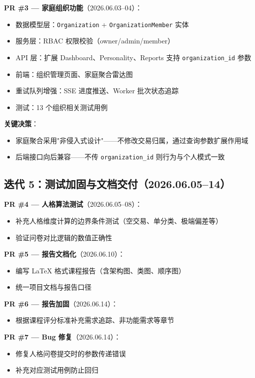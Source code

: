 \textbf{PR \#3 — 家庭组织功能}（2026.06.03--04）：
\begin{itemize}
  \item 数据模型层：\texttt{Organization} + \texttt{OrganizationMember} 实体
  \item 服务层：RBAC 权限校验（owner/admin/member）
  \item API 层：扩展 Dashboard、Personality、Reports 支持 \texttt{organization\_id} 参数
  \item 前端：组织管理页面、家庭聚合雷达图
  \item 重试队列增强：SSE 进度推送、Worker 批次状态追踪
  \item 测试：13 个组织相关测试用例
\end{itemize}

\textbf{关键决策}：
\begin{itemize}
  \item 家庭聚合采用"非侵入式设计"——不修改交易归属，通过查询参数扩展作用域
  \item 后端接口向后兼容——不传 \texttt{organization\_id} 则行为与个人模式一致
\end{itemize}

\subsection{迭代 5：测试加固与文档交付（2026.06.05--14）}

\textbf{PR \#4 — 人格算法测试}（2026.06.05--08）：
\begin{itemize}
  \item 补充人格维度计算的边界条件测试（空交易、单分类、极端偏差等）
  \item 验证问卷对比逻辑的数值正确性
\end{itemize}

\textbf{PR \#5 — 报告文档化}（2026.06.10）：
\begin{itemize}
  \item 编写 LaTeX 格式课程报告（含架构图、类图、顺序图）
  \item 统一项目文档与报告口径
\end{itemize}

\textbf{PR \#6 — 报告加固}（2026.06.14）：
\begin{itemize}
  \item 根据课程评分标准补充需求追踪、非功能需求等章节
\end{itemize}

\textbf{PR \#7 — Bug 修复}（2026.06.14）：
\begin{itemize}
  \item 修复人格问卷提交时的参数传递错误
  \item 补充对应测试用例防止回归
\end{itemize}

